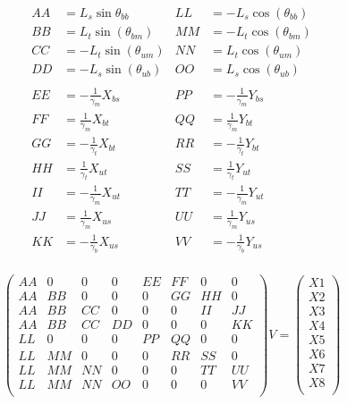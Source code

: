 \documentclass[11pt,twocolumn]{article}
\newcommand{\gb}{\frac{1}{\gamma_b}}
\newcommand{\gm}{\frac{1}{\gamma_m}}
\newcommand{\gt}{\frac{1}{\gamma_t}}
\begin{document}
\begin{align*}
AA &= L_s\sin\theta_{bb}      &  LL &= -L_s\cos(\theta_{bb})\\
BB &= L_t\sin(\theta_{bm})    &	 MM &= -L_t\cos(\theta_{bm})\\
CC &= -L_t\sin(\theta_{um})   &	 NN &= L_t\cos(\theta_{um})\\
DD &= -L_s\sin(\theta_{ub})   &	 OO &= L_s\cos(\theta_{ub})\\
\\
EE &= -\gm X_{bs}       &    PP &= -\gm Y_{bs}\\
FF &= \gm X_{bt}	    &	 QQ &= \gm Y_{bt}\\ 
GG &= -\gt X_{bt}	    &	 RR &= -\gt Y_{bt}\\
HH &= \gt X_{ut}	    &	 SS &= \gt Y_{ut}\\ 
II &= -\gm X_{ut}	    &	 TT &= -\gm Y_{ut}\\
JJ &= \gm X_{us}	    &	 UU &= \gm Y_{us}\\ 
KK &= -\gb X_{us}       &	 VV &= -\gb Y_{us}\\
\end{align*}

\[
\begin{pmatrix}
  AA & 0 & 0 & 0 & EE & FF & 0 & 0\\
  AA & BB & 0 & 0 & 0 & GG & HH & 0\\
  AA & BB & CC & 0 & 0 & 0 & II & JJ\\
  AA & BB & CC & DD & 0 & 0 & 0 & KK\\
  LL & 0 & 0 & 0 & PP & QQ & 0 & 0\\
  LL & MM & 0 & 0 & 0 & RR & SS & 0\\
  LL & MM & NN & 0 & 0 & 0 & TT & UU\\
  LL & MM & NN & OO & 0 & 0 & 0 & VV\\
\end{pmatrix}
V
=
\begin{pmatrix}
  X1\\
  X2\\
  X3\\
  X4\\
  X5\\
  X6\\
  X7\\
  X8\\
\end{pmatrix}
\]
\end{document}

